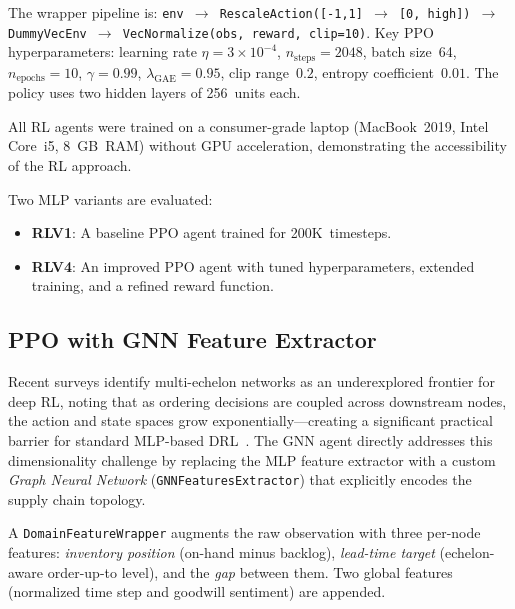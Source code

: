 \documentclass[preprint,12pt]{elsarticle}
\begin{document}
The wrapper pipeline is:
\texttt{env $\to$ RescaleAction([-1,1] $\to$ [0, high]) $\to$
DummyVecEnv $\to$ VecNormalize(obs, reward, clip=10)}.
Key PPO hyperparameters: learning rate $\eta = 3\times 10^{-4}$,
$n_{\text{steps}} = 2048$, batch size~64, $n_{\text{epochs}} = 10$,
$\gamma = 0.99$, $\lambda_{\text{GAE}} = 0.95$, clip range~$0.2$,
entropy coefficient~$0.01$. The policy uses two hidden layers of
256~units each.

All RL agents were trained on a consumer-grade laptop (MacBook~2019,
Intel Core~i5, 8~GB~RAM) without GPU acceleration, demonstrating the
accessibility of the RL approach.

Two MLP variants are evaluated:
\begin{itemize}
  \item \textbf{RLV1}: A baseline PPO agent trained for
        200K~timesteps.
  \item \textbf{RLV4}: An improved PPO agent with tuned
        hyperparameters, extended training, and a refined
        reward function.
\end{itemize}

\subsection{PPO with GNN Feature Extractor}

Recent surveys identify multi-echelon networks as an underexplored
frontier for deep RL, noting that as ordering decisions are coupled
across downstream nodes, the action and state spaces grow
exponentially---creating a significant practical barrier for standard
MLP-based DRL~\citep{gholami2024systematic}. The GNN agent directly
addresses this dimensionality challenge by replacing the MLP feature
extractor with a custom \emph{Graph Neural Network}
(\texttt{GNNFeaturesExtractor}) that explicitly encodes the supply chain
topology.

A \texttt{DomainFeatureWrapper} augments the raw observation
with three per-node features: \emph{inventory position}
(on-hand minus backlog), \emph{lead-time target}
(echelon-aware order-up-to level), and the \emph{gap} between them.
Two global features (normalized time step and goodwill sentiment)
are appended.
\end{document}
